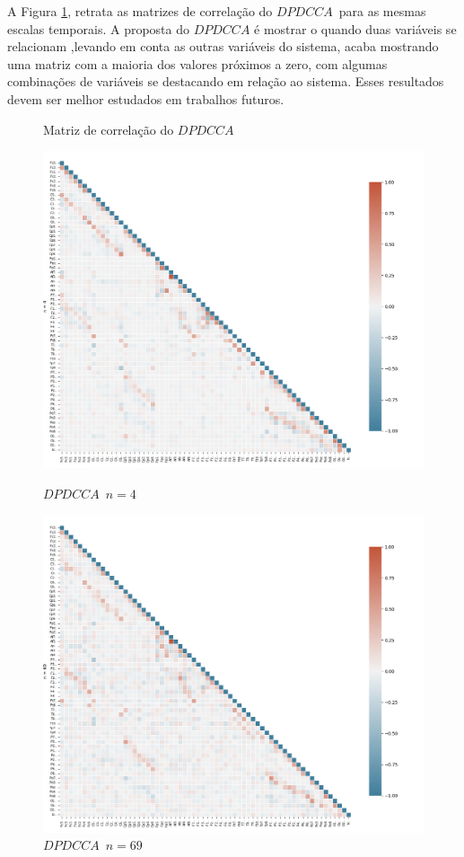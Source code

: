 A Figura \ref{fig:mat_cor_dpdcca}, retrata as matrizes de correlação do $DPDCCA$~para as mesmas escalas temporais. A proposta do $DPDCCA$ é mostrar o quando duas variáveis se relacionam ,levando em conta as outras variáveis do sistema, acaba mostrando uma matriz com a maioria dos valores próximos a zero, com algumas combinações de variáveis se destacando em relação ao sistema. Esses resultados devem ser melhor estudados em trabalhos futuros. 

\begin{figure}[ht]
  \caption{Matriz de correlação do $DPDCCA$}\label{fig:mat_cor_dpdcca}
  \begin{minipage}[b]{0.45\textwidth}
    \includegraphics[width=\textwidth]{./Figures/test_dmc/dpdcca4.png}
    \caption{$DPDCCA$~$n = 4$}
  \end{minipage}
  \hfill
  \begin{minipage}[b]{0.45\textwidth}
    \includegraphics[width=\textwidth]{./Figures/test_dmc/dpdcca69.png}
    \caption{$DPDCCA$~$n = 69$}
  \end{minipage}
\end{figure}



